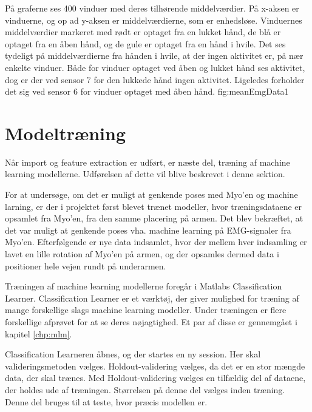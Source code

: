 {
	På graferne ses 400 vinduer med deres tilhørende middelværdier. På x-aksen er vinduerne, og op ad y-aksen er middelværdierne, som er enhedsløse. Vinduernes middelværdier markeret med rødt er optaget fra en lukket hånd, de blå er optaget fra en åben hånd, og de gule er optaget fra en hånd i hvile. Det ses tydeligt på middelværdierne fra hånden i hvile, at der ingen aktivitet er, på nær enkelte vinduer. Både for vinduer optaget ved åben og lukket hånd ses aktivitet, dog er der ved sensor 7 for den lukkede hånd ingen aktivitet. Ligeledes forholder det sig ved sensor 6 for vinduer optaget med åben hånd.
 }{fig:meanEmgData}{1}

\section{Modeltræning}

Når import og feature extraction er udført, er næste del, træning af machine learning modellerne. Udførelsen af dette vil blive beskrevet i denne sektion.


For at undersøge, om det er muligt at genkende poses med Myo'en og machine larning, er der i projektet først blevet trænet modeller, hvor træningsdataene er opsamlet fra Myo'en, fra den samme placering på armen. Det blev bekræftet, at det var muligt at genkende poses vha. machine learning på EMG-signaler fra Myo'en. Efterfølgende er nye data indsamlet, hvor der mellem hver indsamling er lavet en lille rotation af Myo'en på armen, og der opsamles dermed data i positioner hele vejen rundt på underarmen.

Træningen af machine learning modellerne foregår i Matlabs Classification Learner\citep{matlabClassificationLearner}. Classification Learner er et værktøj, der giver mulighed for træning af mange forskellige slags machine learning modeller. Under træningen er flere forskellige afprøvet for at se deres nøjagtighed. Et par af disse er gennemgået i kapitel \ref{chp:mlm}.

Classification Learneren åbnes, og der startes en ny session. Her skal valideringsmetoden vælges. Holdout-validering vælges, da det er en stor mængde data, der skal trænes. Med Holdout-validering vælges en tilfældig del af dataene, der holdes ude af træningen. Størrelsen på denne del vælges inden træning. Denne del bruges til at teste, hvor præcis modellen er\citep{matlabValidation}.

